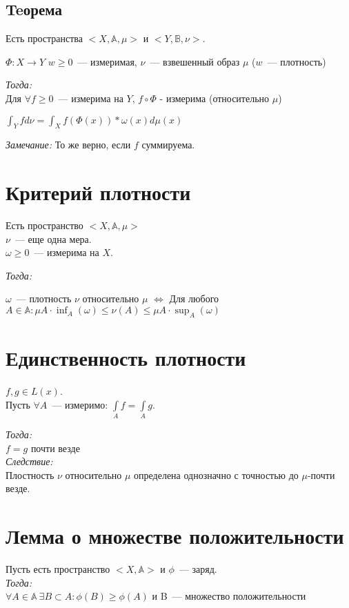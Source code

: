 \documentclass[paper=a4, fontsize=14pt]{report}
\begin{document}
	\subsection {Teорема}
		Есть пространства $<X, \mathbb{A}, \mu>$ и $<Y, \mathbb{B}, \nu>$.

		$\Phi: X\rightarrow Y$
        $w \geq 0$~--- измеримая, $\nu$~--- взвешенный образ $\mu$ ($w$~--- плотность)

		\emph{Тогда:}\\
		 Для $\forall f \geq 0$~--- измерима на $Y$, $f\circ \Phi$ - измерима (относительно $\mu$)

		$\int_{Y}f d\nu = \int_{X} f(\Phi(x)) * \omega(x) d\mu(x)$

		\emph{Замечание:} То же верно, если $f$ суммируема.

\section{Критерий плотности}
	Есть пространство $<X, \mathbb{A}, \mu>$ \\
	$\nu$~--- еще одна мера. \\
	$\omega \geq 0$~--- измерима на $X$.

	\emph{Тогда:}

	$\omega$~--- плотность $\nu$ относительно $\mu$ $\Longleftrightarrow$ Для любого $A\in\mathbb{A}:\mu A \cdot \inf_A(\omega) \leq \nu(A) \leq \mu A \cdot \sup_A(\omega)$

\section{Единственность плотности}
	$f, g \in L(x)$. \\
	Пусть $\forall A$~--- измеримо: $\int\limits_A f = \int\limits_A g$.

	\emph{Тогда: } \\
		$f = g$ почти везде \\
	\emph{Следствие: } \\
		Плостность $\nu$ относительно $\mu$ определена однозначно с точностью до $\mu$-почти везде.

\section{Лемма о множестве положительности}
	Пусть есть пространство $<X, \mathbb{A}>$ и $\phi$~--- заряд.\\
	\emph{Тогда:}\\
		$\forall A\in \mathbb{A}\ \exists B \subset A : \phi(B) \geq \phi(A)$ и B~--- множество положительности \\
\end{document}
